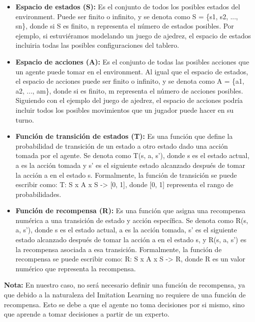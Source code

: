 \begin{itemize}
    \item \textbf{Espacio de estados (S):} Es el conjunto de todos los posibles estados del environment. 
    Puede ser finito o infinito, y se denota como S = \{s1, s2, ..., sn\}, donde si S es finito, n representa 
    el número de estados posibles. Por ejemplo, si estuviéramos modelando un juego de ajedrez, el espacio 
    de estados incluiria todas las posibles configuraciones del tablero.

    \item \textbf{Espacio de acciones (A):} Es el conjunto de todas las posibles acciones que un agente 
    puede tomar en el environment. Al igual que el espacio de estados, el espacio de acciones puede ser finito 
    o infinito, y se denota como A = \{a1, a2, ..., am\}, donde si es finito, m representa el número de 
    acciones posibles. Siguiendo con el ejemplo del juego de ajedrez, el espacio de acciones podría incluir 
    todos los posibles movimientos que un jugador puede hacer en su turno.

    \item \textbf{Función de transición de estados (T):} Es una función que define la probabilidad de transición 
    de un estado a otro estado dado una acción tomada por el agente. Se denota como T(s, a, s'), donde s es el 
    estado actual, a es la acción tomada y s' es el siguiente estado alcanzado después de tomar la acción a en 
    el estado s. Formalmente, la función de transición se puede escribir como: T: S x A x S -> [0, 1], donde 
    [0, 1] representa el rango de probabilidades.

    \item \textbf{Función de recompensa (R):} Es una función que asigna una recompensa numérica a una transición 
    de estado y acción específica. Se denota como R(s, a, s'), donde s es el estado actual, a es la acción tomada, 
    s' es el siguiente estado alcanzado después de tomar la acción a en el estado s, y R(s, a, s') es 
    la recompensa asociada a esa transición. Formalmente, la función de recompensa se puede escribir 
    como: R: S x A x S -> R, donde R es un valor numérico que representa la recompensa. 
\end{itemize}

\textbf{Nota: } En nuestro caso, no será necesario definir una función de recompensa, ya que debido a la 
naturaleza del Imitation Learning no requiere de una función de recompensa. Esto se debe a que el agente 
no toma decisiones por si mismo, sino que aprende a tomar decisiones a partir de un experto.

